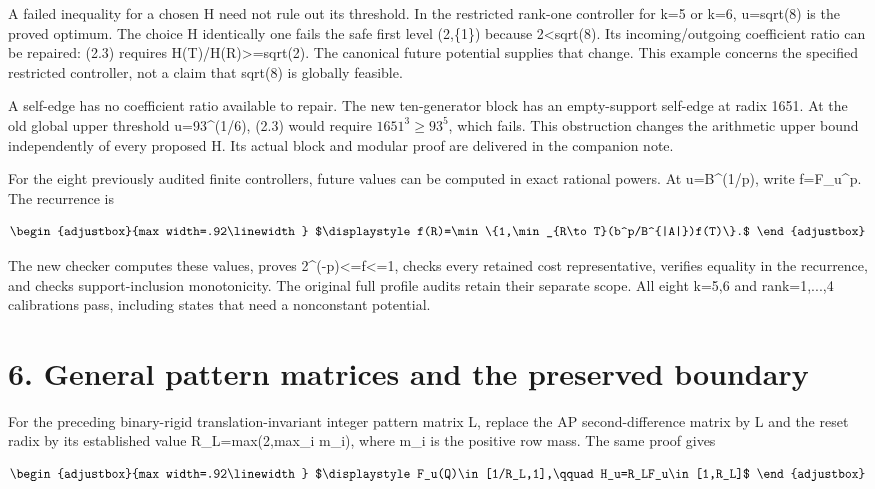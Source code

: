 A failed inequality for a chosen H need not rule out its threshold. In the restricted rank-one controller for k=5 or k=6, u=sqrt(8) is the proved optimum. The choice H identically one fails the safe first level (2,\{1\}) because 2\textless sqrt(8). Its incoming/outgoing coefficient ratio can be repaired: (2.3) requires H(T)/H(R)\textgreater=sqrt(2). The canonical future potential supplies that change. This example concerns the specified restricted controller, not a claim that sqrt(8) is globally feasible.

A self-edge has no coefficient ratio available to repair. The new ten-generator block has an empty-support self-edge at radix 1651. At the old global upper threshold u=93\^{}(1/6), (2.3) would require \(1651^3\ge93^5\), which fails. This obstruction changes the arithmetic upper bound independently of every proposed H. Its actual block and modular proof are delivered in the companion note.

For the eight previously audited finite controllers, future values can be computed in exact rational powers. At u=B\^{}(1/p), write f=F\_u\^{}p. The recurrence is

\[
\begin{adjustbox}{max width=.92\linewidth}
$\displaystyle f(R)=\min\{1,\min_{R\to T}(b^p/B^{|A|})f(T)\}.$
\end{adjustbox}
\]

The new checker computes these values, proves 2\^{}(-p)\textless=f\textless=1, checks every retained cost representative, verifies equality in the recurrence, and checks support-inclusion monotonicity. The original full profile audits retain their separate scope. All eight k=5,6 and rank=1,...,4 calibrations pass, including states that need a nonconstant potential.

\section{6. General pattern matrices and the preserved boundary}\label{n09-general-pattern-matrices-and-the-preserved-boundary}

For the preceding binary-rigid translation-invariant integer pattern matrix L, replace the AP second-difference matrix by L and the reset radix by its established value R\_L=max(2,max\_i m\_i), where m\_i is the positive row mass. The same proof gives

\[
\begin{adjustbox}{max width=.92\linewidth}
$\displaystyle F_u(Q)\in[1/R_L,1],\qquad H_u=R_LF_u\in[1,R_L]$
\end{adjustbox}
\]

